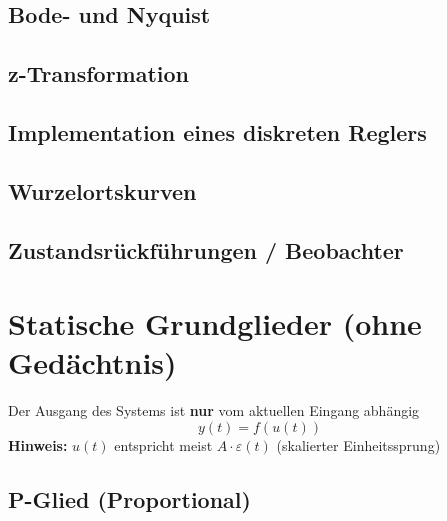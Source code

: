 \subsection{Bode- und Nyquist}




\subsection{z-Transformation}




\subsection{Implementation eines diskreten Reglers}




\subsection{Wurzelortskurven}




\subsection{Zustandsrückführungen / Beobachter}






\section{Statische Grundglieder (ohne Gedächtnis)}

Der Ausgang des Systems ist \textbf{nur} vom aktuellen Eingang abhängig 
$$ y(t) = f( u(t) ) $$
\textbf{Hinweis:} $u(t)$ entspricht meist $A \cdot \varepsilon(t)$ (skalierter Einheitssprung)


\subsection{P-Glied (Proportional)}

\vspace{-0.2cm}

